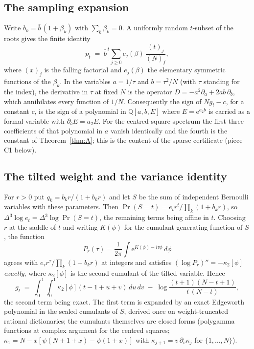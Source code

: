 \documentclass[12pt]{article}
\newcommand{\Qq}{\mathbb{Q}}
\newcommand{\ee}{\mathrm{e}}
\begin{document}
\subsection{The sampling expansion}\label{sec:sampling}

Write $b_k = \bar b\,(1+\beta_k)$ with $\sum_k \beta_k = 0$. A uniformly random $t$-subset of the roots gives the finite identity
\begin{equation}\label{eq:sampling}
p_t \;=\; \bar b^{\,t}\sum_{j\ge 0} e_j(\beta)\,\frac{(t)_j}{(N)_j},
\end{equation}
where $(x)_j$ is the falling factorial and $e_j(\beta)$ the elementary symmetric functions of the $\beta_k$. In the variables $a = 1/\tau$ and $b = \tau^2/N$ (with $\tau$ standing for the index), the derivative in $\tau$ at fixed $N$ is the operator $D = -a^2\partial_a + 2ab\,\partial_b$, which annihilates every function of $1/N$. Consequently the sign of $N g_t - c$, for a constant $c$, is the sign of a polynomial in $\Qq[a,b,E]$ where $E = \ee^{a_2 b}$ is carried as a formal variable with $\partial_b E = a_2 E$. For the centred-square spectrum the first three coefficients of that polynomial in $a$ vanish identically and the fourth is the constant of Theorem~\ref{thm:A}; this is the content of the sparse certificate (piece C1 below).

\subsection{The tilted weight and the variance identity}\label{sec:tilt}

For $r>0$ put $q_k = b_k r/(1+b_k r)$ and let $S$ be the sum of independent Bernoulli variables with these parameters. Then $\Pr(S=t) = e_t r^t/\prod_k(1+b_k r)$, so $\Delta^3\log e_t = \Delta^3\log \Pr(S=t)$, the remaining terms being affine in $t$. Choosing $r$ at the saddle of $t$ and writing $K(\phi)$ for the cumulant generating function of $S$, the function
\[
P_r(\tau) = \frac{1}{2\pi}\int \ee^{K(\phi) - i\tau\phi}\,d\phi
\]
agrees with $e_\tau r^\tau/\prod_k(1+b_k r)$ at integers and satisfies $(\log P_r)'' = -\kappa_2[\phi]$ \emph{exactly}, where $\kappa_2[\phi]$ is the second cumulant of the tilted variable. Hence
\begin{equation}\label{eq:tilt}
g_t \;=\; \int_0^1\!\!\int_0^1 \kappa_2[\phi](t-1+u+v)\,du\,dv \;-\; \log\frac{(t+1)(N-t+1)}{t\,(N-t)},
\end{equation}
the second term being exact. The first term is expanded by an exact Edgeworth polynomial in the scaled cumulants of $S$, derived once on weight-truncated rational dictionaries; the cumulants themselves are closed forms (polygamma functions at complex argument for the centred squares; $\kappa_1 = N - x[\psi(N+1+x)-\psi(1+x)]$ with $\kappa_{j+1} = v\,\partial_v\kappa_j$ for $\{1,\dots,N\}$).
\end{document}
